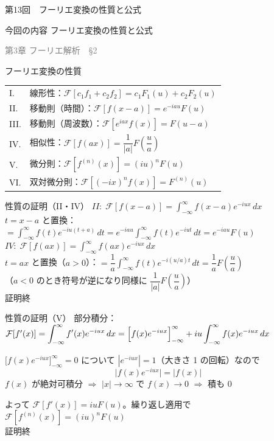 \documentclass[professionalfonts]{beamer}
\begin{document}
\begin{frame}{第13回　フーリエ変換の性質と公式}
  \begin{block}{今回の内容}
  フーリエ変換の性質と公式
  \end{block}
  \vfill\hfill{\scriptsize \textcolor{gray}{第3章 フーリエ解析　§2}}
\end{frame}

\begin{frame}{フーリエ変換の性質}
  \begin{block}{}
  \begin{tabular}{ll}
    I.   & 線形性：$\mathcal{F}[c_{1}f_{1}+c_{2}f_{2}] = c_{1}F_{1}(u)+c_{2}F_{2}(u)$\\[4pt]
    II.  & 移動則（時間）：$\mathcal{F}[f(x-a)] = e^{-iau}F(u)$\\[4pt]
    III. & 移動則（周波数）：$\mathcal{F}[e^{iax}f(x)] = F(u-a)$\\[4pt]
    IV.  & 相似性：$\mathcal{F}[f(ax)] = \dfrac{1}{|a|}F\!\left(\dfrac{u}{a}\right)$\\[6pt]
    V.   & 微分則：$\mathcal{F}[f^{(n)}(x)] = (iu)^{n}F(u)$\\[4pt]
    VI.  & 双対微分則：$\mathcal{F}[(-ix)^{n}f(x)] = F^{(n)}(u)$\\
  \end{tabular}
  \end{block}
\end{frame}

\begin{frame}{性質の証明（II・IV）}
  $II:\; \mathcal{F}[f(x-a)] = \displaystyle\int_{-\infty}^{\infty} f(x-a)e^{-iux}\,dx$\\[2pt]
  $t=x-a$ と置換：$= \displaystyle\int_{-\infty}^{\infty} f(t)e^{-iu(t+a)}\,dt = e^{-iau}\int_{-\infty}^{\infty}f(t)e^{-iut}\,dt = e^{-iau}F(u)$\\[10pt]
  $IV:\; \mathcal{F}[f(ax)] = \displaystyle\int_{-\infty}^{\infty} f(ax)e^{-iux}\,dx$\\[2pt]
  $t=ax$ と置換（$a>0$）：$= \dfrac{1}{a}\displaystyle\int_{-\infty}^{\infty}f(t)e^{-i(u/a)t}\,dt = \dfrac{1}{a}F\!\left(\dfrac{u}{a}\right)$\\[4pt]
  （$a<0$ のとき符号が逆になり同様に $\dfrac{1}{|a|}F\!\left(\dfrac{u}{a}\right)$）
  \\[8pt]\hfill 証明終
\end{frame}

\begin{frame}{性質の証明（V）}
  部分積分：$\mathcal{F}[f'(x)] = \displaystyle\int_{-\infty}^{\infty}f'(x)e^{-iux}\,dx = \Bigl[f(x)e^{-iux}\Bigr]_{-\infty}^{\infty}+iu\int_{-\infty}^{\infty}f(x)e^{-iux}\,dx$\\[8pt]
  \begin{block}{$\bigl[f(x)e^{-iux}\bigr]_{-\infty}^{\infty} = 0$ について}
  $|e^{-iux}| = 1$（大きさ 1 の回転）なので
  \[
    \bigl|f(x)e^{-iux}\bigr| = |f(x)|
  \]
  $f(x)$ が絶対可積分 $\Rightarrow$ $|x|\to\infty$ で $f(x)\to 0$ $\Rightarrow$ 積も $0$
  \end{block}
  よって $\mathcal{F}[f'(x)] = iuF(u)$。繰り返し適用で $\mathcal{F}[f^{(n)}(x)] = (iu)^{n}F(u)$
  \\[6pt]\hfill 証明終
\end{frame}
\end{document}
